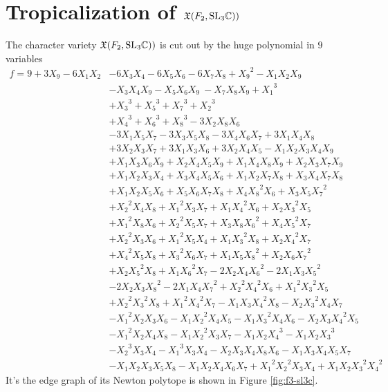 \documentclass[11pt]{article}
\begin{document}
\section{Tropicalization of  $\mathfrak{X}(F_2, \mathrm{SL}_3\mathbb{C}))$}
The character variety $\mathfrak{X}(F_2, \mathrm{SL}_3\mathbb{C}))$ is cut out by the huge
polynomial in $9$ variables
\[
  \begin{aligned}
    f=9+3X_9 - 6X_1X_2
    &-6X_3X_4-6X_5X_6-6X_7X_8 + {X_9}^2- X_1X_2X_9\\
    & - X_3X_4X_9 - X_5X_6X_9\ - X_7X_8X_9+{X_1}^3\\
    &+ {X_3}^3 + {X_5}^3 + {X_7}^3 + {X_2}^3 \\
    &+ {X_4}^3 + {X_6}^3 + {X_8}^3 - 3X_2X_8X_6\\
    &- 3X_1X_5X_7 - 3X_3X_5X_8-3X_4X_6X_7 + 3X_1X_4X_8\\
    &+ 3X_2X_3X_7 + 3X_1X_3X_6 + 3X_2X_4X_5 - X_1X_2X_3X_4X_9\\
    &+ X_1X_3X_6X_9 + X_2X_4X_5X_9 + X_1X_4X_8X_9+X_2X_3X_7X_9\\
    &+ X_1X_2X_3X_4 + X_3X_4X_5X_6+ X_1X_2X_7X_8 + X_3X_4X_7X_8\\
    &+ X_1X_2X_5X_6+ X_5X_6X_7X_8 + X_4{X_8}^2X_6 + X_3X_5{X_7}^2\\
    &+ {X_2}^2X_4X_8 + {X_1}^2X_3X_7 + X_1{X_4}^2X_6 + X_2{X_3}^2X_5\\
    &+ {X_1}^2X_8X_6 + {X_2}^2X_5X_7+ X_3X_8{X_6}^2 + X_4{X_5}^2X_7 \\
    &+ {X_2}^2X_3X_6 + {X_1}^2X_5X_4 + X_1{X_3}^2X_8 + X_2{X_4}^2X_7\\
    &+ {X_4}^2X_5X_8 + {X_3}^2X_6X_7+ X_1X_5{X_8}^2 + X_2X_6{X_7}^2 \\
    &+ X_2{X_5}^2X_8 + X_1{X_6}^2X_7 - 2X_2X_4{X_6}^2 - 2X_1X_3{X_5}^2\\
    &- 2X_2X_3{X_8}^2 - 2X_1X_4{X_7}^2+ {X_2}^2{X_4}^2X_6 +
    {X_1}^2{X_3}^2X_5\\
    &+ {X_2}^2{X_3}^2X_8 + {X_1}^2{X_4}^2X_7- X_1X_3{X_4}^2X_8 -
    X_2{X_3}^2X_4X_7\\
    &- {X_1}^2X_2X_3X_6 - X_1{X_2}^2X_4X_5- X_1{X_3}^2X_4X_6 -
    X_2X_3{X_4}^2X_5\\
    &- {X_1}^2X_2X_4X_8- X_1{X_2}^2X_3X_7 - X_1X_2{X_4}^3 - X_1X_2{X_3}^3\\
    &- {X_2}^3X_3X_4 - {X_1}^3X_3X_4- X_2X_3X_4X_8X_6 - X_1X_3X_4X_5X_7\\
    & - X_1X_2X_3X_5X_8- X_1X_2X_4X_6X_7 + {X_1}^2{X_2}^2X_3X_4 +
    X_1X_2{X_3}^2{X_4}^2
  \end{aligned}
\]
It's the edge graph of its Newton polytope is shown in Figure
\ref{fig:f3-sl3c}.
\end{document}

